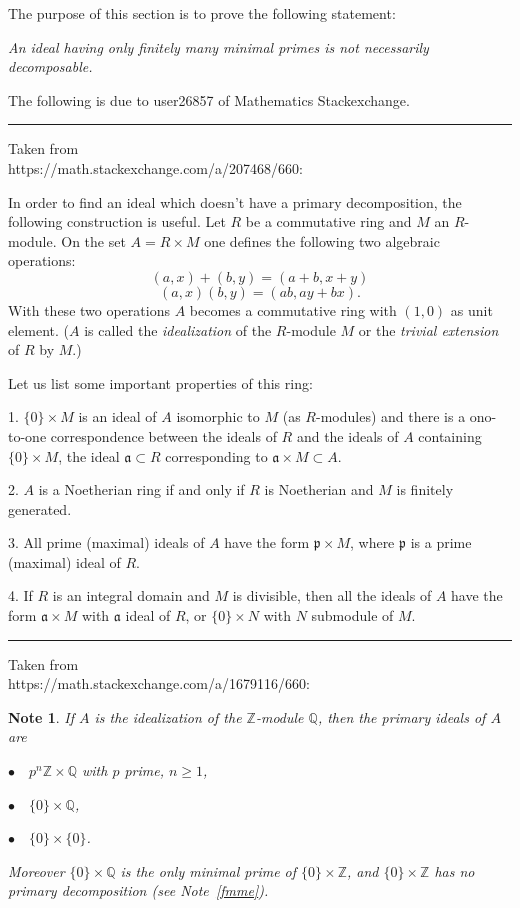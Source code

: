 \documentclass[parskip=half,fontsize=12pt]{scrartcl}%
\newcommand{\mf}{\mathfrak}
\newcommand{\aaa}{\mf a}
\newcommand{\ppp}{\mf p}
\newtheorem{note}[thm]{Note}
\begin{document}
The purpose of this section is to prove the following statement:

\emph{An ideal having only finitely many minimal primes is not necessarily decomposable.}

The following is due to user26857 of Mathematics Stackexchange.\bigskip\bigskip

\hrule\bigskip

Taken from\\ https://math.stackexchange.com/a/207468/660:

In order to find an ideal which doesn't have a primary decomposition, the following construction is useful. Let $R$ be a commutative ring and $M$ an $R$-module. On the set $A=R\times M$ one defines the following two algebraic operations:
$$
(a,x)+(b,y)=(a+b,x+y)
$$
$$
(a,x)(b,y)=(ab,ay+bx).
$$
With these two operations $A$ becomes a commutative ring with $(1,0)$ as unit element. ($A$
is called the \emph{idealization} of the $R$-module $M$ or the \emph{trivial extension} of $R$ by $M$.)

Let us list some important properties of this ring:

1. $\{0\}\times M$ is an ideal of $A$ isomorphic to $M$ (as $R$-modules) and there is a ono-to-one correspondence between the ideals of $R$ and the ideals of $A$ containing $\{0\}\times M$, the ideal $\aaa\subset R$ corresponding to $\aaa\times M\subset A$.

2. $A$ is a Noetherian ring if and only if $R$ is Noetherian and $M$ is finitely generated.

3. All prime (maximal) ideals of $A$ have the form $\ppp\times M$, where $\ppp$ is a prime (maximal) ideal of $R$.

4. If $R$ is an integral domain and $M$ is divisible, then all the ideals of $A$ have the form $\aaa\times M$ with $\aaa$ ideal of $R$, or $\{0\}\times N$ with $N$ submodule of $M$.\bigskip\bigskip

\hrule\bigskip%

Taken from\\ https://math.stackexchange.com/a/1679116/660:\bigskip

\begin{note}%
If $A$ is the idealization of the $\mathbb Z$-module $\mathbb Q$, then the primary ideals of $A$ are  

$\bullet\quad p^n\mathbb Z\times\mathbb Q$ with $p$ prime, $n\ge1$, 

$\bullet\quad\{0\}\times\mathbb Q$,

$\bullet\quad\{0\}\times\{0\}$. 

Moreover $\{0\}\times\mathbb Q$ is the only minimal prime of $\{0\}\times\mathbb Z$, and $\{0\}\times\mathbb Z$ has no primary decomposition (see Note~\ref{fmme}).
\end{note}\bigskip
\end{document}
